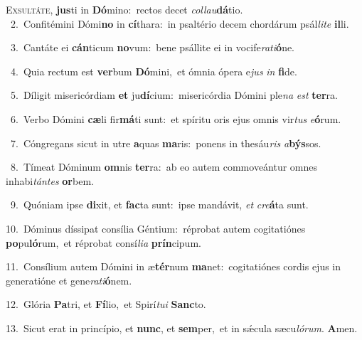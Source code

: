 \lettrine{\initial\textcolor{\initialcolor}{E}}{xsultáte,} \textbf{jus}\-ti in \textbf{Dó}\-mino:~\star rectos decet \textit{col}\-\textit{lau}\textbf{dá}tio.\\
{\numbfont\textcolor{\numbcolor}{~2.}}~Confitémini Dómi\textbf{no} in \textbf{cí}\-thara:~\star in psaltério decem chordárum psál\-\textit{li}\-\textit{te} \textbf{il}\-li.\par
{\numbfont\textcolor{\numbcolor}{~3.}}~Cantáte ei \textbf{cán}\-ticum \textbf{no}\-vum:~\star bene psállite ei in vocife\-\textit{ra}\-\textit{ti}\textbf{ó}ne.\par
{\numbfont\textcolor{\numbcolor}{~4.}}~Quia rectum est \textbf{ver}\-bum \textbf{Dó}\-mini,~\star et ómnia ópera e\textit{jus} \textit{in} \textbf{fi}\-de.\par
{\numbfont\textcolor{\numbcolor}{~5.}}~Díligit misericórdiam \textbf{et} ju\-\textbf{dí}\-cium:~\star misericórdia Dómini ple\textit{na} \textit{est} \textbf{ter}\-ra.\par
{\numbfont\textcolor{\numbcolor}{~6.}}~Verbo Dómini \textbf{cæ}\-li fir\-\textbf{má}\-ti sunt:~\star et spíritu oris ejus omnis vir\textit{tus} \textit{e}\-\textbf{ó}rum.\par
{\numbfont\textcolor{\numbcolor}{~7.}}~Cóngregans sicut in utre \textbf{a}\-quas \textbf{ma}\-ris:~\star ponens in thesáu\textit{ris} \textit{a}\-\textbf{býs}sos.\par
{\numbfont\textcolor{\numbcolor}{~8.}}~Tímeat Dóminum \textbf{om}\-nis \textbf{ter}\-ra:~\star ab eo autem commoveántur omnes inhabi\-\textit{tán}\-\textit{tes} \textbf{or}\-bem.\par
{\numbfont\textcolor{\numbcolor}{~9.}}~Quóniam ipse \textbf{di}\-xit, et \textbf{fac}\-ta sunt:~\star ipse mandávit, \textit{et} \textit{cre}\-\textbf{á}ta sunt.\par
{\numbfont\textcolor{\numbcolor}{10.}}~Dóminus díssipat consília Géntium:~\dagger réprobat autem cogitatiónes \textbf{po}\-pu\-\textbf{ló}\-rum,~\star et réprobat consí\-\textit{li}\-\textit{a} \textbf{prín}\-cipum.\par
{\numbfont\textcolor{\numbcolor}{11.}}~Consílium autem Dómini in æ\-\textbf{tér}\-num \textbf{ma}\-net:~\star cogitatiónes cordis ejus in generatióne et gene\-\textit{ra}\-\textit{ti}\textbf{ó}nem.\par
{\numbfont\textcolor{\numbcolor}{12.}}~Glória \textbf{Pa}\-tri, et \textbf{Fí}\-lio,~\star et Spirí\-\textit{tu}\-\textit{i} \textbf{Sanc}\-to.\par
{\numbfont\textcolor{\numbcolor}{13.}}~Sicut erat in princípio, et \textbf{nunc}\-, et \textbf{sem}\-per,~\star et in sǽcula sæcu\-\textit{ló}\-\textit{rum}. \textbf{A}\-men.\par
